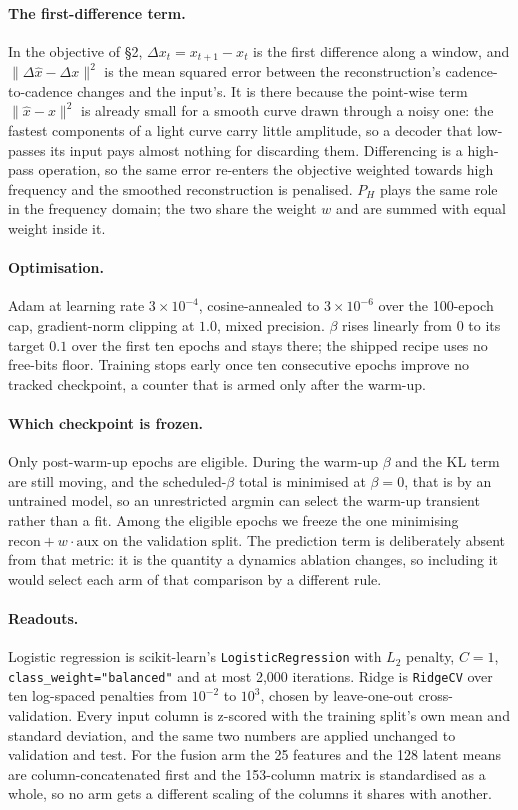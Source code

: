 \documentclass{article}
\begin{document}
\paragraph{The first-difference term.} In the objective of \S2, $\Delta x_{t} = x_{t+1} - x_{t}$ is
the first difference along a window, and $\|\Delta\hat{x}-\Delta x\|^{2}$ is the mean squared error
between the reconstruction's cadence-to-cadence changes and the input's. It is there because the
point-wise term $\|\hat{x}-x\|^{2}$ is already small for a smooth curve drawn through a noisy one:
the fastest components of a light curve carry little amplitude, so a decoder that low-passes its
input pays almost nothing for discarding them. Differencing is a high-pass operation, so the same
error re-enters the objective weighted towards high frequency and the smoothed reconstruction is
penalised. $P_{H}$ plays the same role in the frequency domain; the two share the weight $w$ and are
summed with equal weight inside it.

\paragraph{Optimisation.} Adam at learning rate $3\times10^{-4}$, cosine-annealed to
$3\times10^{-6}$ over the 100-epoch cap, gradient-norm clipping at $1.0$, mixed precision. $\beta$
rises linearly from $0$ to its target $0.1$ over the first ten epochs and stays there; the shipped
recipe uses no free-bits floor. Training stops early once ten consecutive epochs improve no tracked
checkpoint, a counter that is armed only after the warm-up.

\paragraph{Which checkpoint is frozen.} Only post-warm-up epochs are eligible. During the warm-up
$\beta$ and the KL term are still moving, and the scheduled-$\beta$ total is minimised at $\beta=0$,
that is by an untrained model, so an unrestricted argmin can select the warm-up transient rather than
a fit. Among the eligible epochs we freeze the one minimising
$\mathrm{recon} + w\cdot\mathrm{aux}$ on the validation split. The prediction term is deliberately
absent from that metric: it is the quantity a dynamics ablation changes, so including it would select
each arm of that comparison by a different rule.

\paragraph{Readouts.} Logistic regression is scikit-learn's \texttt{LogisticRegression} with $L_{2}$
penalty, $C=1$, \texttt{class\_weight="balanced"} and at most 2{,}000 iterations. Ridge is
\texttt{RidgeCV} over ten log-spaced penalties from $10^{-2}$ to $10^{3}$, chosen by leave-one-out
cross-validation. Every input column is z-scored with the training split's own mean and standard
deviation, and the same two numbers are applied unchanged to validation and test. For the fusion arm
the 25 features and the 128 latent means are column-concatenated first and the 153-column matrix is
standardised as a whole, so no arm gets a different scaling of the columns it shares with another.
\end{document}
